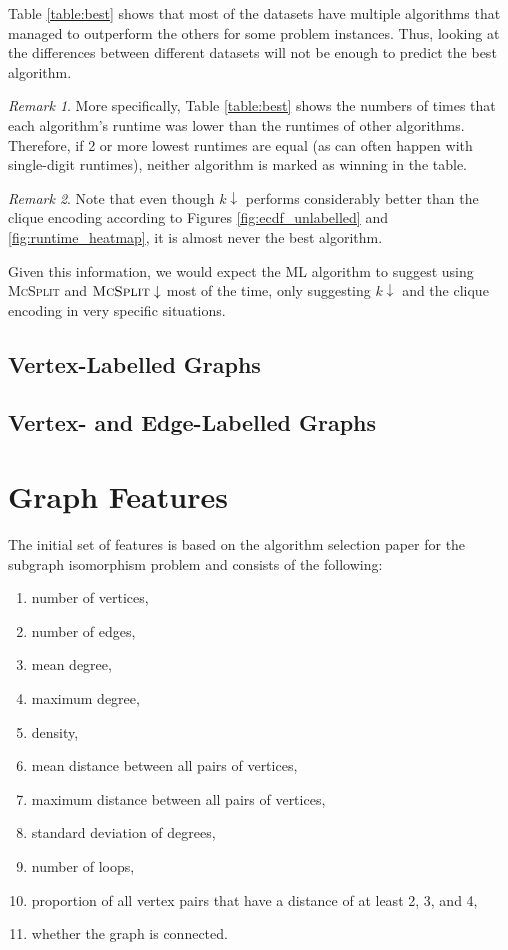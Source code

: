 \documentclass{l4proj}
\theoremstyle{definition}
\theoremstyle{remark}
\newtheorem{remark}{Remark}[section]
\begin{document}
Table \ref{table:best} shows that most of the datasets have multiple algorithms
that managed to outperform the others for some problem instances. Thus, looking
at the differences between different datasets will not be enough to predict the
best algorithm.

\begin{remark}
  More specifically, Table \ref{table:best} shows the numbers of times that each
  algorithm's runtime was lower than the runtimes of other algorithms.
  Therefore, if 2 or more lowest runtimes are equal (as can often happen with
  single-digit runtimes), neither algorithm is marked as winning in the table.
\end{remark}

\begin{remark}
Note that even though $k\downarrow$ performs considerably better than the clique
encoding according to Figures \ref{fig:ecdf_unlabelled} and
\ref{fig:runtime_heatmap}, it is almost never the best algorithm.
\end{remark}

Given this information, we would expect the ML algorithm to suggest using
\textsc{McSplit} and $\textsc{McSplit}\downarrow$ most of the time, only
suggesting $k\downarrow$ and the clique encoding in very specific situations.

\subsection{Vertex-Labelled Graphs}
\subsection{Vertex- and Edge-Labelled Graphs}

\section{Graph Features} \label{sec:features}
The initial set of features is based on the algorithm selection paper for the
subgraph isomorphism problem \cite{DBLP:conf/lion/KotthoffMS16} and consists of
the following:

\begin{enumerate}
\item number of vertices,
\item number of edges,
\item mean degree,
\item maximum degree,
\item density,
\item mean distance between all pairs of vertices,
\item maximum distance between all pairs of vertices,
\item standard deviation of degrees,
\item number of loops,
\item proportion of all vertex pairs that have a distance of at least 2, 3, and 4,
\item whether the graph is connected.
\end{enumerate}
\end{document}
